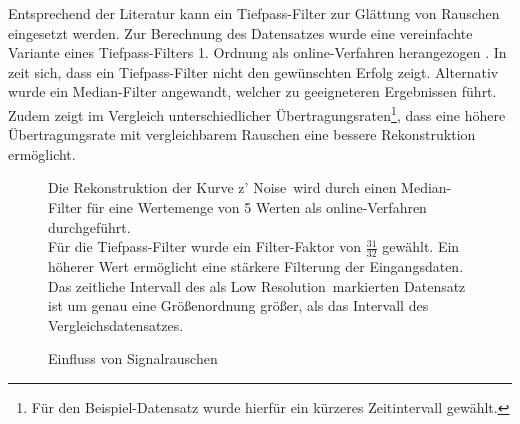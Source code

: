 Entsprechend der Literatur  kann ein Tiefpass-Filter zur Glättung von Rauschen eingesetzt werden. Zur Berechnung des Datensatzes wurde eine vereinfachte Variante eines Tiefpass-Filters 1. Ordnung als online-Verfahren herangezogen . In  zeit sich, dass ein Tiefpass-Filter nicht den gewünschten Erfolg zeigt. Alternativ wurde ein Median-Filter angewandt, welcher zu geeigneteren Ergebnissen führt.\\
Zudem zeigt im Vergleich unterschiedlicher Übertragungsraten\footnote{Für den Beispiel-Datensatz wurde hierfür ein kürzeres Zeitintervall gewählt.}, dass eine höhere Übertragungsrate mit vergleichbarem Rauschen eine bessere Rekonstruktion ermöglicht.

\begin{figure}[ht!]
\vspace{0.25cm}
\begin{center}
\caption{Einfluss von Signalrauschen}
\label{fig:SzeneNoiseHR}
\end{center}

\vspace{0.25cm}
Die Rekonstruktion der Kurve \glqq z' Noise\glqq\ wird durch einen Median-Filter für eine Wertemenge von 5 Werten als online-Verfahren durchgeführt.\\
Für die Tiefpass-Filter wurde ein Filter-Faktor von $\frac{31}{32}$ gewählt. Ein höherer Wert ermöglicht eine stärkere Filterung der Eingangsdaten.\\
Das zeitliche Intervall des als \glqq Low Resolution\grqq\ markierten Datensatz ist um genau eine Größenordnung größer, als das Intervall des  Vergleichsdatensatzes.
\end{figure}


